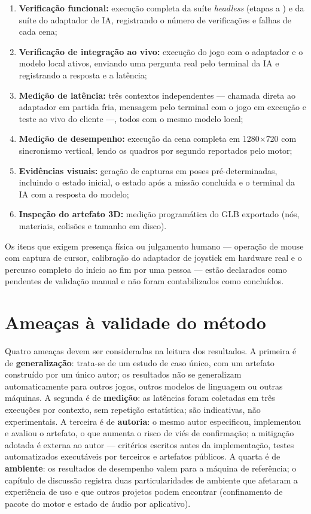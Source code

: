 \begin{enumerate}
  \item \textbf{Verificação funcional:} execução completa da suíte
  \emph{headless} (etapas  a ) e da suíte do adaptador de IA,
  registrando o número de verificações e falhas de cada cena;
  \item \textbf{Verificação de integração ao vivo:} execução do jogo com o
  adaptador e o modelo local ativos, enviando uma pergunta real pelo terminal
  da IA e registrando a resposta e a latência;
  \item \textbf{Medição de latência:} três contextos independentes --- chamada
  direta ao adaptador em partida fria, mensagem pelo terminal com o jogo em
  execução e teste ao vivo do cliente ---, todos com o mesmo modelo local;
  \item \textbf{Medição de desempenho:} execução da cena completa em
  1280$\times$720 com sincronismo vertical, lendo os quadros por segundo
  reportados pelo motor;
  \item \textbf{Evidências visuais:} geração de capturas em poses
  pré-determinadas, incluindo o estado inicial, o estado após a missão
  concluída e o terminal da IA com a resposta do modelo;
  \item \textbf{Inspeção do artefato 3D:} medição programática do GLB
  exportado (nós, materiais, colisões e tamanho em disco).
\end{enumerate}

Os itens que exigem presença física ou julgamento humano --- operação de
mouse com captura de cursor, calibração do adaptador de joystick em hardware
real e o percurso completo do início ao fim por uma pessoa --- estão
declarados como pendentes de validação manual e não foram contabilizados como
concluídos.

\section{Ameaças à validade do método}
\label{sec:ameacas_metodo}

Quatro ameaças devem ser consideradas na leitura dos resultados. A primeira é
de \textbf{generalização}: trata-se de um estudo de caso único, com um
artefato construído por um único autor; os resultados não se generalizam
automaticamente para outros jogos, outros modelos de linguagem ou outras
máquinas. A segunda é de \textbf{medição}: as latências foram coletadas em
três execuções por contexto, sem repetição estatística; são indicativas, não
experimentais. A terceira é de \textbf{autoria}: o mesmo autor especificou,
implementou e avaliou o artefato, o que aumenta o risco de viés de confirmação;
a mitigação adotada é externa ao autor --- critérios escritos antes da
implementação, testes automatizados executáveis por terceiros e artefatos
públicos. A quarta é de \textbf{ambiente}: os resultados de desempenho valem
para a máquina de referência; o capítulo de discussão registra duas
particularidades de ambiente que afetaram a experiência de uso e que outros
projetos podem encontrar (confinamento de pacote do motor e estado de áudio
por aplicativo).

